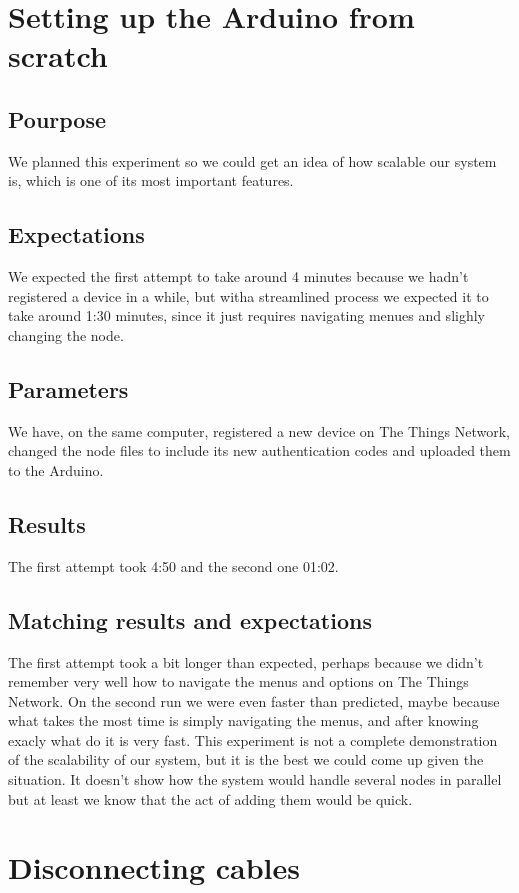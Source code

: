 \section{Setting up the Arduino from scratch}

	\subsection*{Pourpose}
		We planned this experiment so we could get an idea of how scalable our system is, which is one of its most important features.
	\subsection*{Expectations}
		We expected the first attempt to take around 4 minutes because we hadn't registered a device in a while, but witha streamlined process we expected it to take around 1:30 minutes, since it just requires navigating menues and slighly changing the node.
	\subsection*{Parameters}
		We have, on the same computer, registered a new device on The Things Network, changed the node files to include its new authentication codes and uploaded them to the Arduino.
	\subsection*{Results}
		The first attempt took 4:50 and the second one 01:02.
	\subsection*{Matching results and expectations}
		The first attempt took a bit longer than expected, perhaps because we didn't remember very well how to navigate the menus and options on The Things Network. On the second run we were even faster than predicted, maybe because what takes the most time is simply navigating the menus, and after knowing exacly what do it is very fast. This experiment is not a complete demonstration of the scalability of our system, but it is the best we could come up given the situation. It doesn't show how the system would handle several nodes in parallel but at least we know that the act of adding them would be quick.

\section{Disconnecting cables}

